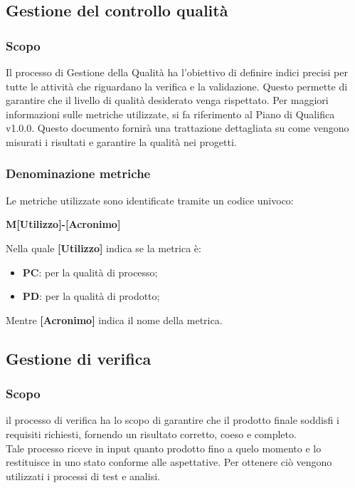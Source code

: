 \subsection{Gestione del controllo qualità}
\subsubsection{Scopo}
Il processo di Gestione della Qualità ha l'obiettivo di definire indici
precisi per tutte le attività che riguardano la verifica e la validazione.
Questo permette di garantire che il livello di qualità desiderato venga
rispettato. Per maggiori informazioni sulle metriche utilizzate,
si fa riferimento al Piano di Qualifica v1.0.0.
Questo documento fornirà una trattazione dettagliata su come
vengono misurati i risultati e garantire la qualità nei progetti.
\subsubsection{Denominazione metriche}
Le metriche utilizzate sono identificate tramite un codice univoco:
\begin{center}
    \textbf{M[Utilizzo]-[Acronimo]}
\end{center}
Nella quale \textbf{[Utilizzo]} indica se la metrica è:
\begin{itemize}
    \item \textbf{PC}: per la qualità di processo;
    \item \textbf{PD}:  per la qualità di prodotto;
\end{itemize}
Mentre \textbf{[Acronimo]} indica il nome della metrica.
\subsection{Gestione di verifica}
\subsubsection{Scopo} il processo di verifica ha lo scopo di garantire che il prodotto finale soddisfi i requisiti richiesti, fornendo un risultato corretto, coeso e completo.\\
Tale processo riceve in input quanto prodotto fino a quelo momento e lo restituisce in uno stato conforme alle aspettative.
Per ottenere ciò vengono utilizzati i processi di test e analisi.
